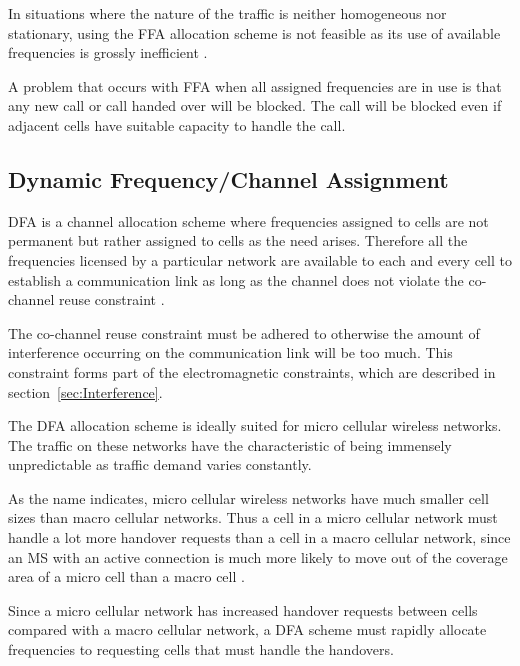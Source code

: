 In situations where the nature of the traffic is neither homogeneous nor stationary, using the \gls{FFA} allocation scheme is not feasible as its use of available frequencies is grossly inefficient \cite{PrinciplesMobileCommunication}.

A problem that occurs with \gls{FFA} when all assigned frequencies are in use is that any new call or call handed over will be blocked\cite{PrinciplesMobileCommunication}. The call will be blocked even if adjacent cells have suitable capacity to handle the call\cite{PrinciplesMobileCommunication}.

\subsection{Dynamic Frequency/Channel Assignment}
\gls{DFA} is a channel allocation scheme where frequencies assigned to cells are not permanent but rather assigned to cells as the need arises\cite{PrinciplesMobileCommunication}. Therefore all the frequencies licensed by a particular network are available to each and every cell to establish a communication link as long as the channel does not violate the co-channel reuse constraint \cite{PrinciplesMobileCommunication}. 

The co-channel reuse constraint must be adhered to otherwise the amount of interference occurring on the communication link will be too much\cite{PrinciplesMobileCommunication}. This constraint forms part of the electromagnetic constraints, which are described in section~\ref{sec:Interference}.

The \gls{DFA} allocation scheme is ideally suited for micro cellular wireless networks. The traffic on these networks have the characteristic of being immensely unpredictable as traffic demand varies constantly\cite{PrinciplesMobileCommunication,MobileWirelessCommunications}.

As the name indicates, micro cellular wireless networks have much smaller cell sizes than macro cellular networks. Thus a cell in a micro cellular network must handle a lot more handover requests than a cell in a macro cellular network, since an \gls{MS} with an active connection is much more likely to move out of the coverage area of a micro cell than a macro cell \cite{PrinciplesMobileCommunication,WirelessCommunications}.

Since a micro cellular network has increased handover requests between cells compared with a macro cellular network, a \gls{DFA} scheme must rapidly allocate frequencies to requesting cells that must handle the handovers\cite{PrinciplesMobileCommunication,WirelessCommunications}.

